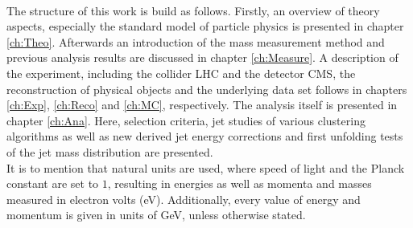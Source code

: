	\\
	The structure of this work is build as follows. Firstly, an overview of theory aspects, especially the standard model of particle physics is presented in chapter \ref{ch:Theo}. Afterwards an introduction of the mass measurement method and previous analysis results are discussed in chapter \ref{ch:Measure}. A description of the experiment, including the collider LHC and the detector CMS, the reconstruction of physical objects and the underlying data set follows in chapters \ref{ch:Exp}, \ref{ch:Reco} and \ref{ch:MC}, respectively. The analysis itself is presented in chapter \ref{ch:Ana}. Here, selection criteria, jet studies of various clustering algorithms as well as new derived jet energy corrections and first unfolding tests of the jet mass distribution are presented.
	\\
	It is to mention that natural units are used, where speed of light and the Planck constant are set to $1$, resulting in energies as well as momenta and masses measured in electron volts (eV). Additionally, every value of energy and momentum is given in units of GeV, unless otherwise stated.